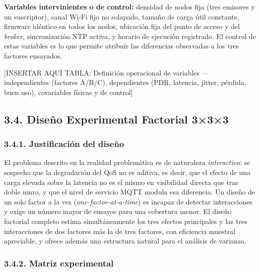 \documentclass[
  12pt,
]{article}
\begin{document}
\textbf{Variables intervinientes o de control:} densidad de nodos fija
(tres emisores y un suscriptor), canal Wi-Fi fijo no solapado, tamaño de
carga útil constante, firmware idéntico en todos los nodos, ubicación
fija del punto de acceso y del \emph{broker}, sincronización NTP activa,
y horario de ejecución registrado. El control de estas variables es lo
que permite atribuir las diferencias observadas a los tres factores
ensayados.

{[}INSERTAR AQUÍ TABLA: Definición operacional de variables —
independientes (factores A/B/C), dependientes (PDR, latencia, jitter,
pérdida, buen uso), covariables físicas y de control{]}

\subsection{3.4. Diseño Experimental Factorial
3×3×3}\label{diseuxf1o-experimental-factorial-333}

\subsubsection{3.4.1. Justificación del
diseño}\label{justificaciuxf3n-del-diseuxf1o}

El problema descrito en la realidad problemática es de naturaleza
\emph{interactiva}: se sospecha que la degradación del QoS no es
aditiva, es decir, que el efecto de una carga elevada sobre la latencia
no es el mismo en visibilidad directa que tras doble muro, y que el
nivel de servicio MQTT modula esa diferencia. Un diseño de un solo
factor a la vez (\emph{one-factor-at-a-time}) es incapaz de detectar
interacciones y exige un número mayor de ensayos para una cobertura
menor. El diseño factorial completo estima simultáneamente los tres
efectos principales y las tres interacciones de dos factores más la de
tres factores, con eficiencia muestral apreciable, y ofrece además una
estructura natural para el análisis de varianza.

\subsubsection{3.4.2. Matriz experimental}\label{matriz-experimental}
\end{document}
